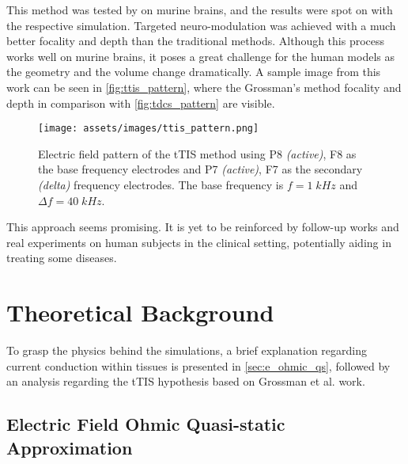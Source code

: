 This method was tested by  on murine brains, and the results were spot on with the respective simulation. Targeted neuro-modulation was achieved with a much better focality and depth than the traditional methods. Although this process works well on murine brains, it poses a great challenge for the human models as the geometry and the volume change dramatically. A sample image from this work can be seen in \autoref{fig:ttis_pattern}, where the Grossman's method focality and depth in comparison with \autoref{fig:tdcs_pattern} are visible.

\begin{figure}[H]
    \centering
    \texttt{[image: assets/images/ttis\_pattern.png]}
    \caption{Electric field pattern of the \gls{tTIS} method using P8 \textit{(active)}, F8 as the base frequency electrodes and P7 \textit{(active)}, F7 as the secondary \textit{(delta)} frequency electrodes. The base frequency is $f = 1\; kHz$ and $\Delta f=40\; kHz$.}
    \label{fig:ttis_pattern}
\end{figure}

This approach seems promising. It is yet to be reinforced by follow-up works and real experiments on human subjects in the clinical setting, potentially aiding in treating some diseases.

\section{Theoretical Background}

To grasp the physics behind the simulations, a brief explanation regarding current conduction within tissues is presented in \autoref{sec:e_ohmic_qs}, followed by an analysis regarding the \gls{tTIS} hypothesis based on Grossman et al.\cite{Grossman2017} work.

\subsection{Electric Field Ohmic Quasi-static Approximation}
\label{sec:e_ohmic_qs}

